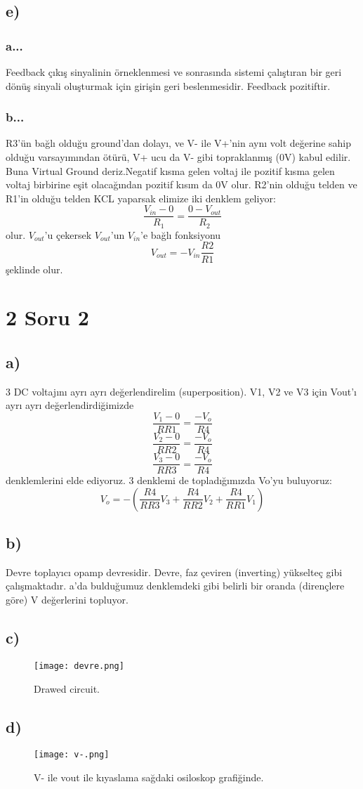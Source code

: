 \documentclass[11pt]{article}
\begin{document}
\subsection{e)}
\subsubsection{a...}
Feedback çıkış sinyalinin örneklenmesi ve sonrasında sistemi çalıştıran bir geri dönüş sinyali oluşturmak için girişin geri beslenmesidir. Feedback pozitiftir.
\subsubsection{b...}
R3'ün bağlı olduğu ground'dan dolayı, ve V- ile V+'nin aynı volt değerine sahip olduğu varsayımından ötürü, V+ ucu da V- gibi topraklanmış (0V) kabul edilir. Buna Virtual Ground deriz.Negatif kısma gelen voltaj ile pozitif kısma gelen voltaj birbirine eşit olacağından pozitif kısım da 0V olur. R2’nin olduğu telden ve R1’in olduğu telden KCL yaparsak elimize iki denklem geliyor:
$$\frac{V_{in} - 0}{R_1} = \frac{0-V_{out}}{R_2}$$
olur. $V_{out}$'u çekersek $V_{out}$'un $V_{in}$'e bağlı fonksiyonu
$$V_{out} = -V_{in} \frac{R2}{R1}$$
şeklinde olur.

\section{2 Soru 2}
\subsection{a)}
3 DC voltajını ayrı ayrı değerlendirelim (superposition). V1, V2 ve V3 için Vout'ı ayrı ayrı değerlendirdiğimizde
$$ \frac{V_1 - 0}{RR1} = \frac{-V_o}{R4} $$
$$ \frac{V_2 - 0}{RR2} = \frac{-V_o}{R4} $$
$$ \frac{V_3 - 0}{RR3} = \frac{-V_o}{R4} $$
denklemlerini elde ediyoruz. 3 denklemi de topladığımızda Vo'yu buluyoruz:
$$V_o = - \left(\frac{R4}{RR3} V_3 + \frac{R4}{RR2} V_2 + \frac{R4}{RR1} V_1\right)$$
\subsection{b) }
Devre toplayıcı opamp devresidir. Devre, faz çeviren (inverting) yükselteç gibi çalışmaktadır. a'da bulduğumuz denklemdeki gibi belirli bir oranda (dirençlere göre) V değerlerini topluyor.
\subsection{c) }
\begin{figure}[H]
\centering
\texttt{[image: devre.png]}
\caption{Drawed circuit.}
\label{fig:figure3}
\end{figure}
\subsection{d) }
\begin{figure}[H]
\centering
\texttt{[image: v-.png]}
\caption{V- ile vout ile kıyaslama sağdaki osiloskop grafiğinde.}
\label{fig:figure3}
\end{figure}
\end{document}
